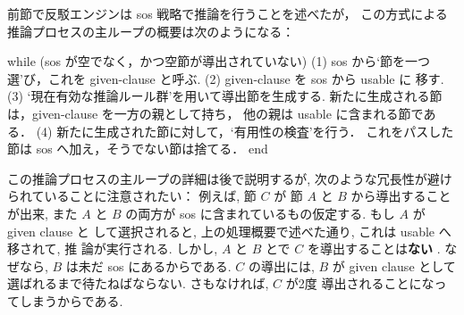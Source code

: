 前節で反駁エンジンは sos 戦略で推論を行うことを述べたが，
この方式による推論プロセスの主ループの概要は次のようになる：

\begin{simplev}[fontfamily=helvetica]
  while (sos が空でなく，かつ空節が導出されていない)
      (1) sos から`節を一つ選'び，これを given-clause と呼ぶ.
      (2) given-clause を sos から usable に 移す.
      (3) `現在有効な推論ルール群'を用いて導出節を生成する.
          新たに生成される節は，given-clause を一方の親として持ち，
          他の親は usable に含まれる節である．
      (4) 新たに生成された節に対して，`有用性の検査'を行う．
          これをパスした節は sos へ加え，そうでない節は捨てる．
  end 
\end{simplev}
この推論プロセスの主ループの詳細は後で説明するが, 次のような冗長性が避け
られていることに注意されたい：
例えば, 節 $C$ が 節 $A$ と $B$ から導出することが出来, また $A$ と
$B$ の両方が sos に含まれているもの仮定する. もし $A$ が given clause と
して選択されると, 上の処理概要で述べた通り, これは usable へ移されて, 推
論が実行される. しかし, $A$ と $B$ とで $C$ を導出することは\textbf{ない
  }. なぜなら, $B$ は未だ sos にあるからである. $C$ の導出には, $B$ が
given clause として選ばれるまで待たねばならない. さもなければ, $C$ が2度
導出されることになってしまうからである.


